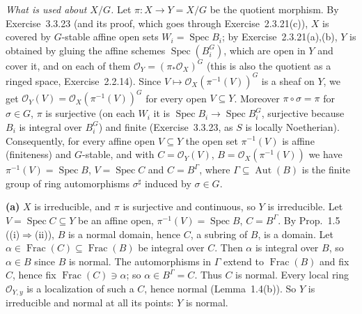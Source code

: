 \documentclass[11pt]{article}
\begin{document}
\pf
\emph{What is used about $X/G$.} Let $\pi:X\to Y=X/G$ be the quotient morphism. By Exercise~3.3.23 (and its proof, which goes through Exercise~2.3.21(c)), $X$ is covered by $G$-stable affine open sets $W_i=\operatorname{Spec}B_i$; by Exercise~2.3.21(a),(b), $Y$ is obtained by gluing the affine schemes $\operatorname{Spec}(B_i^{G})$, which are open in $Y$ and cover it, and on each of them $\mathcal O_Y=(\pi_*\mathcal O_X)^G$ (this is also the quotient as a ringed space, Exercise~2.2.14). Since $V\mapsto\mathcal O_X(\pi^{-1}(V))^G$ is a sheaf on $Y$, we get $\mathcal O_Y(V)=\mathcal O_X(\pi^{-1}(V))^G$ for every open $V\subseteq Y$. Moreover $\pi\circ\sigma=\pi$ for $\sigma\in G$, $\pi$ is surjective (on each $W_i$ it is $\operatorname{Spec}B_i\to\operatorname{Spec}B_i^G$, surjective because $B_i$ is integral over $B_i^G$) and finite (Exercise~3.3.23, as $S$ is locally Noetherian). Consequently, for every affine open $V\subseteq Y$ the open set $\pi^{-1}(V)$ is affine (finiteness) and $G$-stable, and with $C=\mathcal O_Y(V)$, $B=\mathcal O_X(\pi^{-1}(V))$ we have $\pi^{-1}(V)=\operatorname{Spec}B$, $V=\operatorname{Spec}C$ and $C=B^\Gamma$, where $\Gamma\subseteq\operatorname{Aut}(B)$ is the finite group of ring automorphisms $\sigma^\sharp$ induced by $\sigma\in G$.

\textbf{(a)} $X$ is irreducible, and $\pi$ is surjective and continuous, so $Y$ is irreducible. Let $V=\operatorname{Spec}C\subseteq Y$ be an affine open, $\pi^{-1}(V)=\operatorname{Spec}B$, $C=B^\Gamma$. By Prop.~1.5 ((i)$\Rightarrow$(ii)), $B$ is a normal domain, hence $C$, a subring of $B$, is a domain. Let $\alpha\in\operatorname{Frac}(C)\subseteq\operatorname{Frac}(B)$ be integral over $C$. Then $\alpha$ is integral over $B$, so $\alpha\in B$ since $B$ is normal. The automorphisms in $\Gamma$ extend to $\operatorname{Frac}(B)$ and fix $C$, hence fix $\operatorname{Frac}(C)\ni\alpha$; so $\alpha\in B^\Gamma=C$. Thus $C$ is normal. Every local ring $\mathcal O_{Y,y}$ is a localization of such a $C$, hence normal (Lemma~1.4(b)). So $Y$ is irreducible and normal at all its points: $Y$ is normal.
\end{document}
